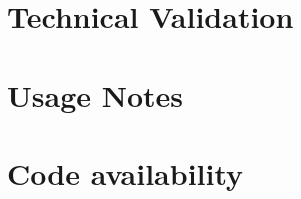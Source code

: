 \documentclass[fleqn,10pt]{wlscirep}
\begin{document}
\section*{Technical Validation}


\section*{Usage Notes}



\section*{Code availability}



\end{document}

